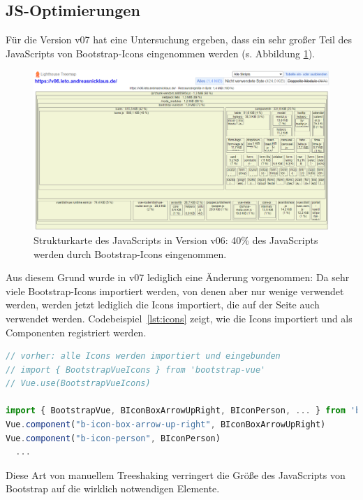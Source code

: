 \documentclass[11pt,a4paper]{article}
\begin{document}
\subsection{JS-Optimierungen}
Für die Version v07 hat eine Untersuchung ergeben, dass ein sehr großer Teil des JavaScripts von Bootstrap-Icons eingenommen werden (s. Abbildung \ref{fig:treemap}).

\begin{figure}[h]
  \centering
  \includegraphics[scale=.5]{images/v06_treemap.png}
  \caption{Strukturkarte des JavaScripts in Version v06: 40\% des JavaScripts werden durch Bootstrap-Icons eingenommen.}
  \label{fig:treemap}
\end{figure}

Aus diesem Grund wurde in v07 lediglich eine Änderung vorgenommen: Da sehr viele Bootstrap-Icons importiert werden, von denen aber nur wenige verwendet werden, werden jetzt lediglich die Icons importiert, die auf der Seite auch verwendet werden.
Codebeispiel~\ref{lst:icons} zeigt, wie die Icons importiert und als Componenten registriert werden.

\begin{lstlisting}[language=JavaScript, caption={Epliziter Import und Einbindung von Bootstrap-Icons}, label={lst:icons}]
// vorher: alle Icons werden importiert und eingebunden
// import { BootstrapVueIcons } from 'bootstrap-vue'
// Vue.use(BootstrapVueIcons)

import { BootstrapVue, BIconBoxArrowUpRight, BIconPerson, ... } from 'bootstrap-vue'
Vue.component("b-icon-box-arrow-up-right", BIconBoxArrowUpRight)
Vue.component("b-icon-person", BIconPerson)
  ...
\end{lstlisting}

Diese Art von manuellem Treeshaking verringert die Größe des JavaScripts von Bootstrap auf die wirklich notwendigen Elemente.
\end{document}

